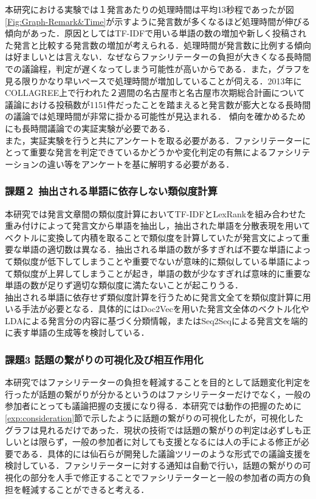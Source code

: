 本研究における実験では１発言あたりの処理時間は平均13秒程であったが図\ref{Fig:Graph-Remark&Time}が示すように発言数が多くなるほど処理時間が伸びる傾向があった．原因としてはTF-IDFで用いる単語の数の増加や新しく投稿された発言と比較する発言数の増加が考えられる．処理時間が発言数に比例する傾向は好ましいとは言えない．なぜならファシリテーターの負担が大きくなる長時間での議論程，判定が遅くなってしまう可能性が高いからである．また，グラフを見る限りかなり早いペースで処理時間が増加していることが伺える．2013年にCOLLAGREE上で行われた２週間の名古屋市と名古屋市次期総合計画について議論における投稿数が1151件だった\cite{collagree_Experiment}ことを踏まえると発言数が膨大となる長時間の議論では処理時間が非常に掛かる可能性が見込まれる．
傾向を確かめるためにも長時間議論での実証実験が必要である．
\\
また，実証実験を行うと共にアンケートを取る必要がある．ファシリテーターにとって重要な発言を判定できているかどうかや変化判定の有無によるファシリテーションの違い等をアンケートを基に解明する必要がある．
\subsubsection*{課題２ 抽出される単語に依存しない類似度計算}
本研究では発言文章間の類似度計算においてTF-IDFとLexRankを組み合わせた重み付けによって発言文から単語を抽出し，抽出された単語を分散表現を用いてベクトルに変換して内積を取ることで類似度を計算していたが発言文によって重要な単語の適切数は異なる．抽出される単語の数が多すぎれば不要な単語によって類似度が低下してしまうことや重要でないが意味的に類似している単語によって類似度が上昇してしまうことが起き，単語の数が少なすぎれば意味的に重要な単語の数が足りず適切な類似度に満たないことが起こりうる．
\\
抽出される単語に依存せず類似度計算を行うために発言文全てを類似度計算に用いる手法が必要となる．具体的にはDoc2Vec\cite{}を用いた発言文全体のベクトル化やLDAによる発言分の内容に基づく分類情報，またはSeq2Seq\cite{}による発言文を端的に表す単語の生成等を検討している．

\subsubsection*{課題3 話題の繋がりの可視化及び相互作用化}
本研究ではファシリテーターの負担を軽減することを目的として話題変化判定を行ったが話題の繋がりが分かるというのはファシリテーターだけでなく，一般の参加者にとっても議論把握の支援になり得る．本研究では動作の把握のために\ref{exp:consideration}節で示したように話題の繋がりの可視化したが，可視化したグラフは見れるだけであった．現状の技術では話題の繋がりの判定は必ずしも正しいとは限らず，一般の参加者に対しても支援となるには人の手による修正が必要である．具体的には仙石らが開発した議論ツリーのような形式での議論支援を検討している．ファシリテーターに対する通知は自動で行い，話題の繋がりの可視化の部分を人手で修正することでファシリテーターと一般の参加者の両方の負担を軽減することができると考える．

